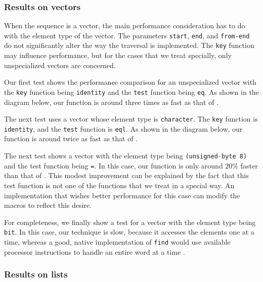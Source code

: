 \subsubsection{Results on vectors}

When the sequence is a vector, the main performance consideration has
to do with the element type of the vector.  The parameters
\texttt{start}, \texttt{end}, and \texttt{from-end} do not
significantly alter the way the traversal is implemented.  The
\texttt{key} function may influence performance, but for the cases
that we treat specially, only unspecialized vectors are concerned.

Our first test shows the performance comparison for an unspecialized
vector with the \texttt{key} function being \texttt{identity} and the
\texttt{test} function being \texttt{eq}.  As shown in the diagram
below, our function is around three times as fast as that of \sbcl{}.


The next test uses a vector whose element type is
\texttt{character}.  The \texttt{key} function is \texttt{identity},
and the \texttt{test} function is \texttt{eql}.  As shown in the
diagram below, our function is around twice as fast as that of
\sbcl{}.


The next test shows a vector with the element type being
\texttt{(unsigned-byte 8)} and the test function being \texttt{=}.  In
this case, our function is only around $20\%$ faster than that of
\sbcl{}.  This modest improvement can be explained by the fact that
this test function is not one of the functions that we treat in a
special way.  An implementation that wishes better performance for
this case can modify the macros to reflect this desire.


For completeness, we finally show a test for a vector with the element
type being \texttt{bit}.  In this case, our technique is slow, because
it accesses the elements one at a time, whereas a good, native
implementation of \texttt{find} would use available processor
instructions to handle an entire word at a time
\cite{Baker:1990:EIB:121989.121991}.


\subsubsection{Results on lists}

